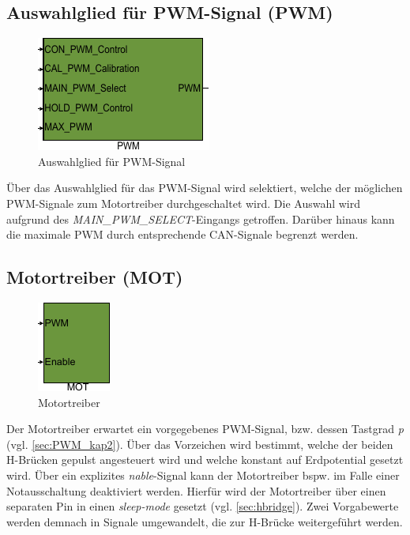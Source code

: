 \subsection{Auswahlglied für PWM-Signal (PWM)}

\begin{figure}[H]%
\centering
\includegraphics[width=0.2\columnwidth]{./Bilder/fig_pwm}%
\caption{Auswahlglied für PWM-Signal}%
\label{fig_pwm}%
\end{figure}

Über das Auswahlglied für das PWM-Signal wird selektiert, welche der möglichen PWM-Signale zum Motortreiber durchgeschaltet wird. Die Auswahl wird aufgrund des \textit{MAIN\_PWM\_SELECT}-Eingangs getroffen. Darüber hinaus kann die maximale PWM durch entsprechende CAN-Signale begrenzt werden. 

\subsection{Motortreiber (MOT)} \label{subsec:MOT}

\begin{figure}[H]%
\centering
\includegraphics[width=0.2\columnwidth]{./Bilder/fig_mot}%
\caption{Motortreiber}%
\label{fig_mot}%
\end{figure}

Der Motortreiber erwartet ein vorgegebenes PWM-Signal, bzw. dessen Tastgrad \textit{p} (vgl. \autoref{sec:PWM_kap2}). Über das Vorzeichen wird bestimmt, welche der beiden H-Brücken gepulst angesteuert wird und welche konstant auf Erdpotential gesetzt wird. Über ein explizites \textit{nable}-Signal kann der Motortreiber bspw. im Falle einer Notausschaltung deaktiviert werden. Hierfür wird der Motortreiber über einen separaten Pin in einen \textit{sleep-mode} gesetzt (vgl. \autoref{sec:hbridge}). Zwei Vorgabewerte werden demnach in Signale umgewandelt, die zur H-Brücke weitergeführt werden.


